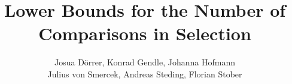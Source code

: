 \documentclass[twoside,leqno,twocolumn]{article}
\begin{document}
%
\newcommand\relatedversion{}



\title{\Large Lower Bounds for the Number of Comparisons in Selection\relatedversion}

\author{Josua Dörrer, Konrad Gendle, Johanna Hofmann \\ Julius von Smercek, Andreas Steding, Florian Stober}

\date{}

\maketitle






\end{document}

